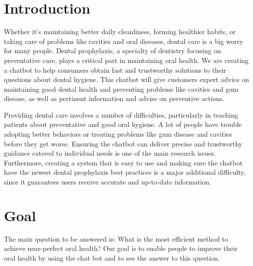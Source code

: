 \documentclass[a0,portrait]{a0poster}
\begin{document}
\begin{mdframed}[style=MyFrame]

\begin{multicols}{2} %



\section{Introduction}\label{section:1}

Whether it's maintaining better daily cleanliness, forming healthier habits, or taking care of problems like cavities and oral diseases, dental care is a big worry for many people. Dental prophylaxis, a specialty of dentistry focusing on preventative care, plays a critical part in maintaining oral health. We are creating a chatbot to help consumers obtain fast and trustworthy solutions to their questions about dental hygiene. This chatbot will give customers expert advice on maintaining good dental health and preventing problems like cavities and gum disease, as well as pertinent information and advise on preventive actions.

Providing dental care involves a number of difficulties, particularly in teaching patients about preventative and good oral hygiene. A lot of people have trouble adopting better behaviors or treating problems like gum disease and cavities before they get worse. Ensuring the chatbot can deliver precise and trustworthy guidance catered to individual needs is one of the main research issues. Furthermore, creating a system that is easy to use and making sure the chatbot have the newest dental prophylaxis best practices is a major additional difficulty, since it guarantees users receive accurate and up-to-date information.


%



\section{Goal}\label{section2}
%
The main question to be answered is: What is the most efficient method to achieve near-perfect oral health? Our goal is to enable people to improve their oral health by using the chat bot and to see the answer to this question.
%


\end{multicols}
\end{mdframed}
\end{document}
